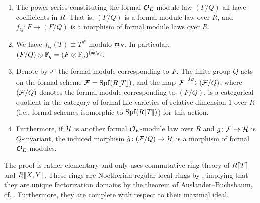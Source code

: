 \documentclass[../main.tex]{subfiles}
\begin{document}
\begin{thm}\label{thm:Quotients}\leavevmode
  \begin{enumerate}
    \item The power series constituting the formal $\mathcal{O}_E$-module law $(F/Q)$
      all have coefficients in $R$. That is, $(F/Q)$ is a formal module law over
      $R$, and $f_Q\colon F \to (F/Q)$ is a morphism of formal module laws over $R$. 
    \item We have $f_Q(T) \equiv T^{q^c}$ modulo $\mathfrak{m}_R$. In particular,
      $(F/Q)\otimes {\overline{\mathbb{F}}_q} = (F \otimes {\overline{\mathbb{F}}_q})^{(\# Q)}$. 
    \item Denote by $\mathcal{F}$ the formal module corresponding to $F$. The finite group
      $Q$ acts on the formal scheme $\mathcal{F} = \operatorname{Spf}(R\llbracket T \rrbracket)$, and the 
      map $\mathcal{F} \xrightarrow{f_Q} (\mathcal{F}/Q)$, where $(\mathcal{F}/Q)$ denotes the formal module
      corresponding to $(F/Q)$, is a categorical quotient 
      in the category of formal Lie-varieties of relative dimension $1$ over $R$  
      (i.e., formal schemes isomorphic to $\operatorname{Spf}(R\llbracket T \rrbracket)$) for this
      action. 
    \item Furthermore, if $\mathcal{H}$ is another formal $\mathcal{O}_E$-module law over $R$ and
      $g\colon \mathcal{F} \to \mathcal{H}$ is $Q$-invariant, the induced morphism
      $\tilde g \colon (\mathcal{F}/Q) \to \mathcal{H}$ is a morphism of formal $\mathcal{O}_E$-modules.
  \end{enumerate}
\end{thm}
The proof is rather elementary and only uses commutative ring theory of 
$R\llbracket T \rrbracket$ and $R\llbracket X,Y \rrbracket$. These rings are Noetherian regular
local rings by \cite[Proposition 19.5]{matsumura1989commutative}, implying 
that they are unique factorization domains by the theorem of
Auslander--Buchsbaum, cf.
\cite[\href{https://stacks.math.columbia.edu/tag/0AG0}{Tag
0AG0}]{stacks-project}. Furthermore, they are complete with respect to their
maximal ideal.
\end{document}
